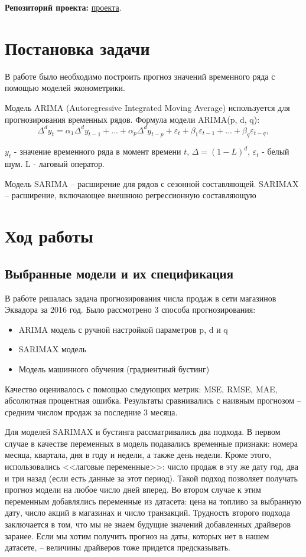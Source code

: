 \documentclass[]{article}
\begin{document}
{
	\Large
	\noindent \textbf{Репозиторий проекта:}
	\href{https://github.com/MaximKiryakin/Vega/tree/main/%D0%A4%D0%B8%D0%BD%D0%B0%D0%BD%D1%81%D0%BE%D0%B2%D0%B0%D1%8F%20%D1%8D%D0%BA%D0%BE%D0%BD%D0%BE%D0%BC%D0%B5%D1%82%D1%80%D0%B8%D0%BA%D0%B0/%D0%9F%D1%80%D0%BE%D0%B5%D0%BA%D1%82%201}{проекта}.
}

\section{Постановка задачи}

В работе было необходимо построить прогноз значений временного ряда с помощью моделей эконометрики. 

Модель ARIMA (Autoregressive Integrated Moving Average) используется для прогнозирования временных рядов.
Формула модели ARIMA(p, d, q):
$$
\Delta^d y_t = \alpha_1 \Delta^d y_{t-1} + ... + \alpha_p\Delta^dy_{t-p} + \varepsilon_t + \beta_1\varepsilon_{t-1} + ... + \beta_q\varepsilon_{t-q},
$$

$y_t$ - значение временного ряда в момент времени $t$, $\Delta = (1 - L)^d$, $\varepsilon_t$ - белый шум. L - лаговый оператор.

Модель SARIMA – расширение для рядов с сезонной составляющей. SARIMAX – расширение, включающее внешнюю регрессионную составляющую


\section{Ход работы}
\subsection{Выбранные модели и их спецификация}
В работе решалась задача прогнозирования числа продаж в сети магазинов Эквадора за 2016 год. Было рассмотрено 3 способа прогнозирования:
\begin{itemize}
	\item ARIMA модель с ручной настройкой параметров p, d и q
	\item SARIMAX модель
	\item Модель машинного обучения (градиентный бустинг)
\end{itemize}


Качество оценивалось с помощью следующих метрик: MSE, RMSE, MAE, абсолютная процентная ошибка. Результаты сравнивались с наивным прогнозом -- средним числом продаж за последние 3 месяца. 

Для моделей SARIMAX и бустинга рассматривались два подхода. В первом случае в качестве переменных в модель подавались временные признаки: номера месяца, квартала, дня в году и недели, а также день недели.
Кроме этого, использовались <<лаговые переменные>>: число продаж в эту же дату год, два и три назад (если есть данные за этот период). Такой подход позволяет получать прогноз модели на любое число дней вперед. Во втором случае к этим переменным добавлялись переменные из датасета: цена на топливо за выбранную дату, число акций в магазинах и число транзакций. Трудность второго подхода заключается в том, что мы не знаем будущие значений добавленных драйверов заранее. Если мы хотим получить прогноз на даты, которых нет в нашем датасете, -- величины драйверов тоже придется предсказывать.
\end{document}
